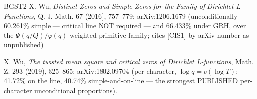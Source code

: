 \documentclass[11pt]{amsart}
\theoremstyle{plain}
\theoremstyle{remark}
\begin{document}
\begin{thebibliography}{BGST2}
 X. Wu, \emph{Distinct Zeros and Simple Zeros for the Family of
Dirichlet L-Functions}, Q. J. Math. 67 (2016), 757--779; arXiv:1206.1679
(unconditionally 60.261\% simple --- critical line NOT required --- and 66.433\%
under GRH, over the $\Psi(q/Q)/\varphi(q)$-weighted primitive family; cites [CIS1]
by arXiv number as unpublished)

 X. Wu, \emph{The twisted mean square and critical zeros of
Dirichlet L-functions}, Math. Z. 293 (2019), 825--865; arXiv:1802.09704 (per
character, $\log q = o(\log T)$: 41.72\% on the line, 40.74\% simple-and-on-line ---
the strongest PUBLISHED per-character unconditional proportions).

\end{thebibliography}
\end{document}
